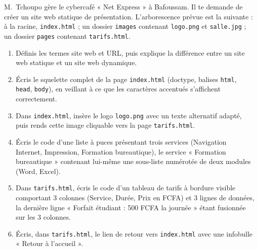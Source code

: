 \documentclass[11pt]{article}
\newcommand{\cle}[1]{{\popxbold\color{popdark}#1}}
\begin{document}
\begin{exercice}
M.~Tchoupo gère le cybercafé « Net Express » à Bafoussam. Il te demande de créer un site web statique de présentation. L'arborescence prévue est la suivante : à la racine, \texttt{index.html} ; un dossier \texttt{images} contenant \texttt{logo.png} et \texttt{salle.jpg} ; un dossier \texttt{pages} contenant \texttt{tarifs.html}.
\begin{enumerate}
\item Définis les termes \cle{site web} et \cle{URL}, puis explique la différence entre un site web statique et un site web dynamique.
\item Écris le squelette complet de la page \texttt{index.html} (doctype, balises \texttt{html}, \texttt{head}, \texttt{body}), en veillant à ce que les caractères accentués s'affichent correctement.
\item Dans \texttt{index.html}, insère le logo \texttt{logo.png} avec un texte alternatif adapté, puis rends cette image cliquable vers la page \texttt{tarifs.html}.
\item Écris le code d'une liste à puces présentant trois services (Navigation Internet, Impression, Formation bureautique), le service « Formation bureautique » contenant lui-même une sous-liste numérotée de deux modules (Word, Excel).
\item Dans \texttt{tarifs.html}, écris le code d'un tableau de tarifs à bordure visible comportant 3 colonnes (Service, Durée, Prix en FCFA) et 3 lignes de données, la dernière ligne « Forfait étudiant : 500 FCFA la journée » étant fusionnée sur les 3 colonnes.
\item Écris, dans \texttt{tarifs.html}, le lien de retour vers \texttt{index.html} avec une infobulle « Retour à l'accueil ».
\end{enumerate}
\end{exercice}
\end{document}
